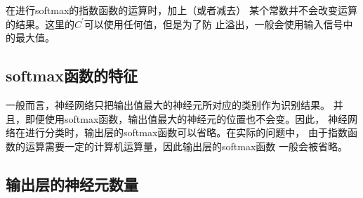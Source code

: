 在进行softmax的指数函数的运算时，加上（或者减去）
某个常数并不会改变运算的结果。这里的$C^{'}$可以使用任何值，但是为了防
止溢出，一般会使用输入信号中的最大值。
\subsection{softmax函数的特征}
一般而言，神经网络只把输出值最大的神经元所对应的类别作为识别结果。
并且，即便使用softmax函数，输出值最大的神经元的位置也不会变。因此，
神经网络在进行分类时，输出层的softmax函数可以省略。在实际的问题中，
由于指数函数的运算需要一定的计算机运算量，因此输出层的softmax函数
一般会被省略。
\subsection{输出层的神经元数量}
